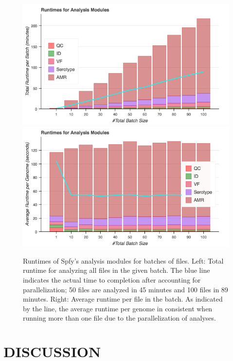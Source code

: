 \documentclass{article}
\begin{document}
\begin{figure}[!htb]
  \includegraphics[width=\linewidth]{images/spfy_batches_totals.png}
\endminipage\hfill
{}%
  \includegraphics[width=\linewidth]{images/spfy_batches.png}
\endminipage
\caption{Runtimes of Spfy's analysis modules for batches of files. Left: Total runtime for analyzing all files in the given batch. The blue line indicates the actual time to completion after accounting for parallelization; 50 files are analyzed in 45 minutes and 100 files in 89 minutes. Right: Average runtime per file in the batch. As indicated by the line, the average runtime per genome in consistent when running more than one file due to the parallelization of analyses.}\label{fig:spfy_performance_batches}
\end{figure}

\section{DISCUSSION}
\end{document}
